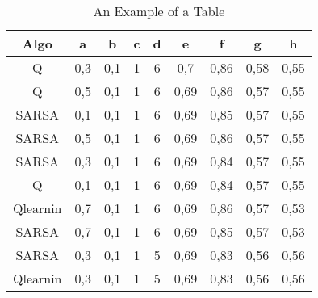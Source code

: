 \begin{table}[!htb]
\renewcommand{\arraystretch}{1.3}
\caption{An Example of a Table}
\label{table_example}
\centering
\begin{tabular}{|c||c||c||c||c||c||c||c||c|}
\hline
Algo & a & b & c & d & e & f & g & h\\
\hline
Q & 0,3 & 0,1 & 1 & 6 & 0,7 & 0,86 & 0,58 & 0,55\\
\hline
Q & 0,5 & 0,1 & 1 & 6 & 0,69 & 0,86 & 0,57 & 0,55\\
\hline
SARSA & 0,1 & 0,1 & 1 & 6 & 0,69 & 0,85 & 0,57 & 0,55\\
\hline
SARSA & 0,5 & 0,1 & 1 & 6 & 0,69 & 0,86 & 0,57 & 0,55\\
\hline
SARSA & 0,3 & 0,1 & 1 & 6 & 0,69 & 0,84 & 0,57 & 0,55\\
\hline
Q & 0,1 & 0,1 & 1 & 6 & 0,69 & 0,84 & 0,57 & 0,55\\
\hline
Qlearnin & 0,7 & 0,1 & 1 & 6 & 0,69 & 0,86 & 0,57 & 0,53\\
\hline
SARSA & 0,7 & 0,1 & 1 & 6 & 0,69 & 0,85 & 0,57 & 0,53\\
\hline
SARSA & 0,3 & 0,1 & 1 & 5 & 0,69 & 0,83 & 0,56 & 0,56\\
\hline
Qlearnin & 0,3 & 0,1 & 1 & 5 & 0,69 & 0,83 & 0,56 & 0,56\\
\hline
\end{tabular}
\end{table}
